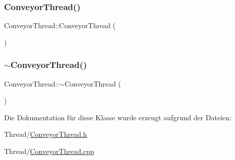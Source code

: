 \subsubsection{\texorpdfstring{Conveyor\+Thread()}{ConveyorThread()}}
{\footnotesize\ttfamily Conveyor\+Thread\+::\+Conveyor\+Thread (\begin{DoxyParamCaption}{ }\end{DoxyParamCaption})}

\hypertarget{class_conveyor_thread_ac496ae2a4708c7cd3af20721c1bf8b8a}{}\label{class_conveyor_thread_ac496ae2a4708c7cd3af20721c1bf8b8a} 
\subsubsection{\texorpdfstring{$\sim$\+Conveyor\+Thread()}{~ConveyorThread()}}
{\footnotesize\ttfamily Conveyor\+Thread\+::$\sim$\+Conveyor\+Thread (\begin{DoxyParamCaption}{ }\end{DoxyParamCaption})\hspace{0.3cm}{\ttfamily [virtual]}}



Die Dokumentation für diese Klasse wurde erzeugt aufgrund der Dateien\+:\begin{DoxyCompactItemize}
\item 
Thread/\hyperlink{_conveyor_thread_8h}{Conveyor\+Thread.\+h}\item 
Thread/\hyperlink{_conveyor_thread_8cpp}{Conveyor\+Thread.\+cpp}\end{DoxyCompactItemize}
